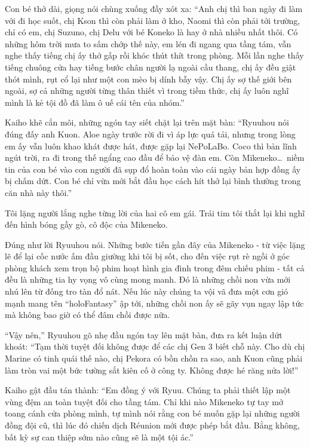 \documentclass[../main.tex]{subfiles}
\begin{document}
Con bé thở dài, giọng nói chùng xuống đầy xót xa: ``Anh chị thì ban ngày đi làm với đi học suốt, chị Kson thì còn phải làm ở kho, Naomi thì còn phải tới trường, chỉ có em, chị Suzuno, chị Delu với bé Koneko là hay ở nhà nhiều nhất thôi. Có những hôm trời mưa to sấm chớp thế này, em lén đi ngang qua tầng tám, vẫn nghe thấy tiếng chị ấy thở gấp rồi khóc thút thít trong phòng. Mỗi lần nghe thấy tiếng chuông cửa hay tiếng bước chân người lạ ngoài cầu thang, chị ấy đều giật thót mình, rụt cổ lại như một con mèo bị dính bẫy vậy. Chị ấy sợ thế giới bên ngoài, sợ cả những người từng thân thiết vì trong tiềm thức, chị ấy luôn nghĩ mình là kẻ tội đồ đã làm ô uế cái tên của nhóm.''

Kaiho khẽ cắn môi, những ngón tay siết chặt lại trên mặt bàn: ``Ryuuhou nói đúng đấy anh Kuon. Aloe ngày trước rời đi vì áp lực quá tải, nhưng trong lòng em ấy vẫn luôn khao khát được hát, được gặp lại NePoLaBo. Coco thì bản lĩnh ngút trời, ra đi trong thế ngẩng cao đầu để bảo vệ đàn em. Còn Mikeneko\dots\ niềm tin của con bé vào con người đã sụp đổ hoàn toàn vào cái ngày bản hợp đồng ấy bị chấm dứt. Con bé chỉ vừa mới bắt đầu học cách hít thở lại bình thường trong căn nhà này thôi.''

Tôi lặng người lắng nghe từng lời của hai cô em gái. Trái tim tôi thắt lại khi nghĩ đến hình bóng gầy gò, cô độc của Mikeneko.

Đúng như lời Ryuuhou nói. Những bước tiến gần đây của Mikeneko - từ việc lặng lẽ để lại cốc nước ấm đầu giường khi tôi bị sốt, cho đến việc rụt rè ngồi ở góc phòng khách xem trọn bộ phim hoạt hình gia đình trong đêm chiếu phim - tất cả đều là những tia hy vọng vô cùng mong manh. Đó là những chồi non vừa mới nhú lên từ đống tro tàn đổ nát. Nếu lúc này chúng ta vội vã đưa một cơn gió mạnh mang tên ``holoFantasy'' ập tới, những chồi non ấy sẽ gãy vụn ngay lập tức mà không bao giờ có thể đâm chồi được nữa.

``Vậy nên,'' Ryuuhou gõ nhẹ đầu ngón tay lên mặt bàn, đưa ra kết luận dứt khoát: ``Tạm thời tuyệt đối không được để các chị Gen 3 biết chỗ này. Cho dù chị Marine có tinh quái thế nào, chị Pekora có bồn chồn ra sao, anh Kuon cũng phải làm tròn vai một bức tường sắt kiên cố ở công ty. Không được hé răng nửa lời!''

Kaiho gật đầu tán thành: ``Em đồng ý với Ryuu. Chúng ta phải thiết lập một vùng đệm an toàn tuyệt đối cho tầng tám. Chỉ khi nào Mikeneko tự tay mở toang cánh cửa phòng mình, tự mình nói rằng con bé muốn gặp lại những người đồng đội cũ, thì lúc đó chiến dịch Réunion mới được phép bắt đầu. Bằng không, bất kỳ sự can thiệp sớm nào cũng sẽ là một tội ác.''
\end{document}
